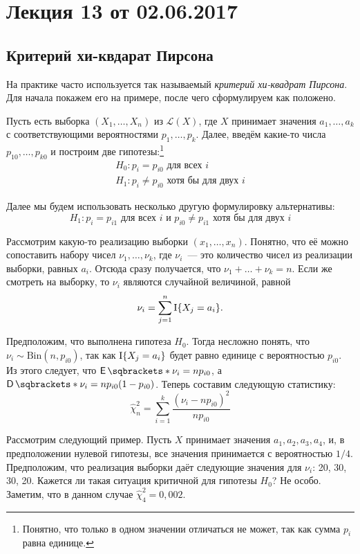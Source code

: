 \section{Лекция 13 от 02.06.2017}
\subsection{Критерий хи-квдарат Пирсона}
На практике часто используется так называемый \emph{критерий хи-квадрат 
Пирсона}. Для начала покажем его на примере, после чего сформулируем как 
положено.

Пусть есть выборка \((X_{1}, \dots, X_{n})\) из \(\mathcal{L}(X)\), где \(X\) 
принимает значения \(a_{1}, \dots, a_{k}\) с соответствующими вероятностями 
\(p_{1}, \dots, p_{k}\). Далее, введём какие-то числа \(p_{10}, \dots, p_{k0}\) 
и построим две гипотезы:\footnote{Понятно, что только в одном значении 
отличаться не может, так как сумма \(p_{i}\) равна единице.}
\begin{gather*}
	H_{0} : p_{i} = p_{i0} \text{ для всех } i \\
	H_{1} : p_{i} \neq p_{i0} \text{ хотя бы для двух }i
\end{gather*}

Далее мы будем использовать несколько другую формулировку альтернативы:
\[
	H_{1} : p_{i} = p_{i1} \text{ для всех } i \text{ и } p_{i0} \neq p_{i1}  
	\text{ хотя бы для двух }i
\]

Рассмотрим какую-то реализацию выборки \((x_{1}, \dots, x_{n})\). Понятно, что 
её можно сопоставить набору чисел \(\nu_{1}, \dots, \nu_{k}\), где 
\(\nu_{i}\)~--- это количество чисел из реализации выборки, равных \(a_{i}\). 
Отсюда сразу получается, что \(\nu_{1} + \dots + \nu_{k} = n\). Если же 
смотреть на выборку, то \(\nu_{i}\) являются случайной величиной, равной
\[
	\nu_{i} = \sum_{j = 1}^{n} \operatorname{\mathrm{I}}\{X_{j} = a_{i}\}.
\]

Предположим, что выполнена гипотеза \(H_{0}\). Тогда несложно понять, что 
\(\nu_{i} \sim \mathrm{Bin}(n, p_{i0})\), так как \(\operatorname{\mathrm{I}}\{X_{j} = a_{i}\}\) будет 
равно единице с вероятностью \(p_{i0}\). Из этого следует, что \(\E{\nu_{i}} = 
np_{i0}\), а \(\D{\nu_{i}} = np_{i0}(1 - p_{i0})\). Теперь составим следующую 
статистику:
\[
	\hat{\chi}^{2}_{n} = \sum_{i = 1}^{k}\frac{(\nu_{i} - np_{i0})^{2}}{np_{i0}}
\]

Рассмотрим следующий пример. Пусть \(X\) принимает значения \(a_{1}, a_{2}, 
a_{3}, a_{4}\), и, в предположении нулевой гипотезы, все значения принимается с 
вероятностью \(1/4\). Предположим, что реализация выборки даёт следующие 
значения для \(\nu_{i}\): 20, 30, 30, 20. Кажется ли такая ситуация критичной 
для гипотезы \(H_{0}\)? Не особо. Заметим, что в данном случае 
\(\hat{\chi}^{2}_{4} = 0,002\).

